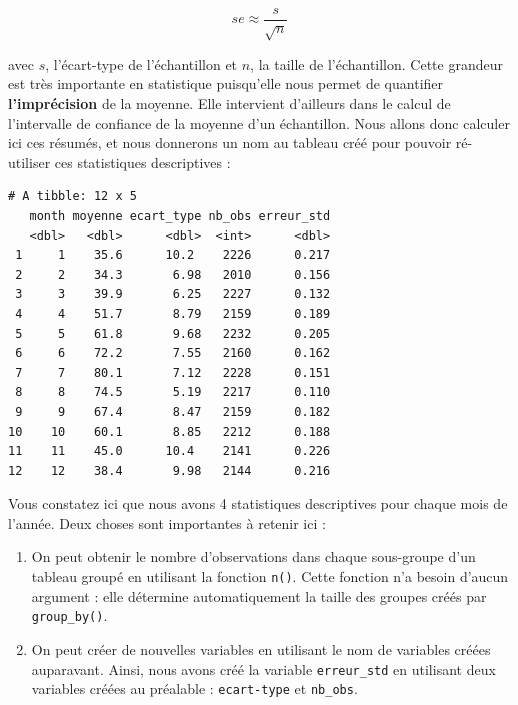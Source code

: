 \documentclass[a4paperpaper,]{article}
\newenvironment{Shaded}{\begin{snugshade}}{\end{snugshade}}
\newcommand{\DataTypeTok}[1]{\textcolor[rgb]{0.00,0.34,0.68}{#1}}
\newcommand{\KeywordTok}[1]{\textcolor[rgb]{0.12,0.11,0.11}{\textbf{#1}}}
\newcommand{\NormalTok}[1]{\textcolor[rgb]{0.12,0.11,0.11}{#1}}
\newcommand{\OperatorTok}[1]{\textcolor[rgb]{0.12,0.11,0.11}{#1}}
\newcommand{\OtherTok}[1]{\textcolor[rgb]{0.00,0.43,0.16}{#1}}
\newcommand{\StringTok}[1]{\textcolor[rgb]{0.75,0.01,0.01}{#1}}
\providecommand{\tightlist}{%
  \setlength{\itemsep}{0pt}\setlength{\parskip}{0pt}}
\begin{document}
\[se \approx \frac{s}{\sqrt{n}}\]

avec \(s\), l'écart-type de l'échantillon et \(n\), la taille de l'échantillon. Cette grandeur est très importante en statistique puisqu'elle nous permet de quantifier \textbf{l'imprécision} de la moyenne. Elle intervient d'ailleurs dans le calcul de l'intervalle de confiance de la moyenne d'un échantillon. Nous allons donc calculer ici ces résumés, et nous donnerons un nom au tableau créé pour pouvoir ré-utiliser ces statistiques descriptives :

\begin{Shaded}
\end{Shaded}

\begin{verbatim}
# A tibble: 12 x 5
   month moyenne ecart_type nb_obs erreur_std
   <dbl>   <dbl>      <dbl>  <int>      <dbl>
 1     1    35.6      10.2    2226      0.217
 2     2    34.3       6.98   2010      0.156
 3     3    39.9       6.25   2227      0.132
 4     4    51.7       8.79   2159      0.189
 5     5    61.8       9.68   2232      0.205
 6     6    72.2       7.55   2160      0.162
 7     7    80.1       7.12   2228      0.151
 8     8    74.5       5.19   2217      0.110
 9     9    67.4       8.47   2159      0.182
10    10    60.1       8.85   2212      0.188
11    11    45.0      10.4    2141      0.226
12    12    38.4       9.98   2144      0.216
\end{verbatim}

Vous constatez ici que nous avons 4 statistiques descriptives pour chaque mois de l'année. Deux choses sont importantes à retenir ici :

\begin{enumerate}
\def\labelenumi{\arabic{enumi}.}
\tightlist
\item
  On peut obtenir le nombre d'observations dans chaque sous-groupe d'un tableau groupé en utilisant la fonction \texttt{n()}. Cette fonction n'a besoin d'aucun argument : elle détermine automatiquement la taille des groupes créés par \texttt{group\_by()}.
\item
  On peut créer de nouvelles variables en utilisant le nom de variables créées auparavant. Ainsi, nous avons créé la variable \texttt{erreur\_std} en utilisant deux variables créées au préalable : \texttt{ecart-type} et \texttt{nb\_obs}.
\end{enumerate}
\end{document}
